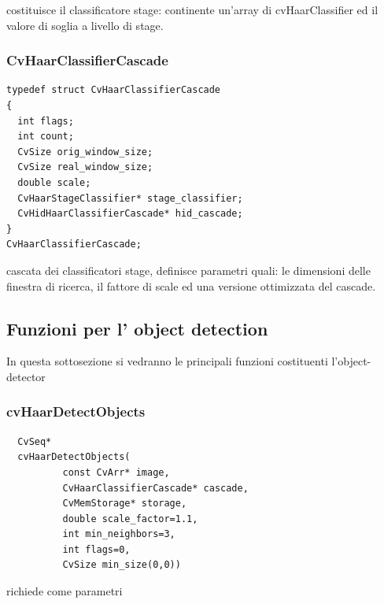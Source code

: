 \documentclass[a4paper,11pt]{article}
\begin{document}
costituisce il classificatore stage: continente un'array di
cvHaarClassifier ed il valore di soglia a livello di stage.

\subsubsection{CvHaarClassifierCascade}
\label{sec:cvhaarclassifiercascade}

\begin{lstlisting}
typedef struct CvHaarClassifierCascade
{
  int flags;
  int count;
  CvSize orig_window_size;
  CvSize real_window_size;
  double scale;
  CvHaarStageClassifier* stage_classifier;
  CvHidHaarClassifierCascade* hid_cascade;
} 
CvHaarClassifierCascade;
\end{lstlisting}

cascata dei classificatori stage, definisce parametri quali: le
dimensioni delle finestra di ricerca, il fattore di scale ed una
versione ottimizzata del cascade.


\subsection{Funzioni per l' object detection}
\label{sec:detect}
In questa sottosezione si vedranno le principali funzioni costituenti
l'object-detector

\subsubsection{cvHaarDetectObjects}
\label{sec:cvhaar}

\begin{lstlisting}
  CvSeq* 
  cvHaarDetectObjects(
          const CvArr* image,
          CvHaarClassifierCascade* cascade,
          CvMemStorage* storage,
          double scale_factor=1.1,
          int min_neighbors=3,
          int flags=0,
          CvSize min_size(0,0))
\end{lstlisting}

richiede come parametri 
\end{document}
